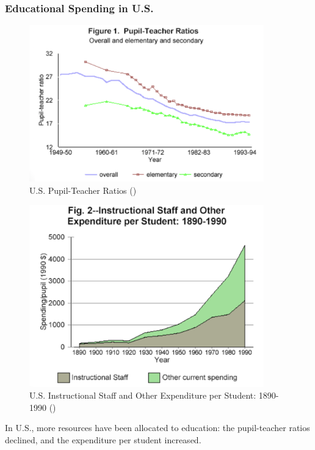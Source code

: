         \subsubsection{Educational Spending in U.S.}
            \begin{figure}[H]
                \centering
                \includegraphics[width=4in]{images/ch9/9 us res 1.png}
                \caption{U.S. Pupil-Teacher Ratios (\cite{hanushek_handbook_2016})}
            \end{figure}
            \begin{figure}[H]
                \centering
                \includegraphics[width=4in]{images/ch9/9 us res 2.png}
                \caption{U.S. Instructional Staff and Other Expenditure per Student: 1890-1990 (\cite{hanushek_handbook_2016})}
            \end{figure}
            In U.S., more resources have been allocated to education: the pupil-teacher ratios declined, and the expenditure per student increased.
            
